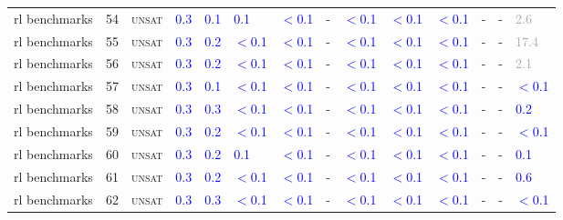 \begin{center}
{\begin{longtable}{@{}llllllllllllll@{}}
rl benchmarks & 54 & \textsc{unsat} & \textcolor{blue}{0.3} & \textcolor{blue}{0.1} & \textcolor{blue}{0.1} & \textcolor{blue}{$<$0.1} & - & \textcolor{blue}{$<$0.1} & \textcolor{blue}{$<$0.1} & \textcolor{blue}{$<$0.1} & - & - & \textcolor{darkgray}{2.6} \\
rl benchmarks & 55 & \textsc{unsat} & \textcolor{blue}{0.3} & \textcolor{blue}{0.2} & \textcolor{blue}{$<$0.1} & \textcolor{blue}{$<$0.1} & - & \textcolor{blue}{$<$0.1} & \textcolor{blue}{$<$0.1} & \textcolor{blue}{$<$0.1} & - & - & \textcolor{darkgray}{17.4} \\
rl benchmarks & 56 & \textsc{unsat} & \textcolor{blue}{0.3} & \textcolor{blue}{0.2} & \textcolor{blue}{$<$0.1} & \textcolor{blue}{$<$0.1} & - & \textcolor{blue}{$<$0.1} & \textcolor{blue}{$<$0.1} & \textcolor{blue}{$<$0.1} & - & - & \textcolor{darkgray}{2.1} \\
rl benchmarks & 57 & \textsc{unsat} & \textcolor{blue}{0.3} & \textcolor{blue}{0.1} & \textcolor{blue}{$<$0.1} & \textcolor{blue}{$<$0.1} & - & \textcolor{blue}{$<$0.1} & \textcolor{blue}{$<$0.1} & \textcolor{blue}{$<$0.1} & - & - & \textcolor{blue}{$<$0.1} \\
rl benchmarks & 58 & \textsc{unsat} & \textcolor{blue}{0.3} & \textcolor{blue}{0.3} & \textcolor{blue}{$<$0.1} & \textcolor{blue}{$<$0.1} & - & \textcolor{blue}{$<$0.1} & \textcolor{blue}{$<$0.1} & \textcolor{blue}{$<$0.1} & - & - & \textcolor{blue}{0.2} \\
rl benchmarks & 59 & \textsc{unsat} & \textcolor{blue}{0.3} & \textcolor{blue}{0.2} & \textcolor{blue}{$<$0.1} & \textcolor{blue}{$<$0.1} & - & \textcolor{blue}{$<$0.1} & \textcolor{blue}{$<$0.1} & \textcolor{blue}{$<$0.1} & - & - & \textcolor{blue}{$<$0.1} \\
rl benchmarks & 60 & \textsc{unsat} & \textcolor{blue}{0.3} & \textcolor{blue}{0.2} & \textcolor{blue}{0.1} & \textcolor{blue}{$<$0.1} & - & \textcolor{blue}{$<$0.1} & \textcolor{blue}{$<$0.1} & \textcolor{blue}{$<$0.1} & - & - & \textcolor{blue}{0.1} \\
rl benchmarks & 61 & \textsc{unsat} & \textcolor{blue}{0.3} & \textcolor{blue}{0.2} & \textcolor{blue}{$<$0.1} & \textcolor{blue}{$<$0.1} & - & \textcolor{blue}{$<$0.1} & \textcolor{blue}{$<$0.1} & \textcolor{blue}{$<$0.1} & - & - & \textcolor{blue}{0.6} \\
rl benchmarks & 62 & \textsc{unsat} & \textcolor{blue}{0.3} & \textcolor{blue}{0.3} & \textcolor{blue}{$<$0.1} & \textcolor{blue}{$<$0.1} & - & \textcolor{blue}{$<$0.1} & \textcolor{blue}{$<$0.1} & \textcolor{blue}{$<$0.1} & - & - & \textcolor{blue}{$<$0.1} \\

\end{longtable}}
\end{center}
